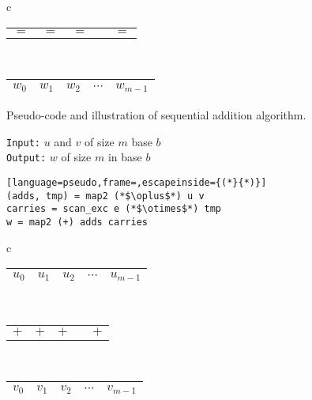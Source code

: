 \begin{figure}
\begin{minipage}{0.45\textwidth}
\begin{tabular}{c}
      \begin{tabular}{C{0.7cm}C{0.7cm}C{0.8cm}C{0.7cm}C{0.7cm}}
        $=$ & $=$ & $=$ &  & $=$  
      \end{tabular}\\
      \begin{tabular}{|C{0.7cm}|C{0.7cm}|C{0.7cm}|C{0.7cm}|C{0.7cm}|}
        \hline
        $w_{0}$ & $w_1$ & $w_2$ & $\cdots$ & $w_{m-1}$\\
        \hline
      \end{tabular}
    \end{tabular}
  \end{minipage}
  \caption{Pseudo-code and illustration of sequential addition algorithm.}
  \label{fig:addseq}
\end{figure}

\begin{figure}
  \centering
  \begin{minipage}{0.45\textwidth}
    \small
    \texttt{Input:} $u$ and $v$ of size $m$ base $b$\\
    \texttt{Output:} $w$ of size $m$ in base $b$
\begin{lstlisting}[language=pseudo,frame=,escapeinside={(*}{*)}]
(adds, tmp) = map2 (*$\oplus$*) u v
carries = scan_exc e (*$\otimes$*) tmp
w = map2 (+) adds carries
\end{lstlisting}
  \end{minipage}
  \begin{minipage}{0.45\textwidth}
    \centering
    \footnotesize
    \begin{tabular}{c}
      \begin{tabular}{|C{0.7cm}|C{0.7cm}|C{0.7cm}|C{0.7cm}|C{0.7cm}|}
        \hline
        $u_0$ & $u_1$ & $u_2$ & $\cdots$ & $u_{m-1}$\\ 
        \hline
      \end{tabular}\\
      \begin{tabular}{C{0.7cm}C{0.7cm}C{0.7cm}C{0.7cm}C{0.7cm}}
        $+$ & $+$ & $+$ & & $+$\\ 
      \end{tabular}\\
      \begin{tabular}{|C{0.7cm}|C{0.7cm}|C{0.7cm}|C{0.7cm}|C{0.7cm}|}
        \hline
        $v_0$ & $v_1$ & $v_2$ & $\cdots$ & $v_{m-1}$\\
        \hline
      \end{tabular}\\
      \begin{tabular}{C{0.7cm}C{0.7cm}C{0.7cm}C{0.7cm}C{0.7cm}}

\end{tabular}
\end{tabular}
\end{minipage}
\end{figure}
